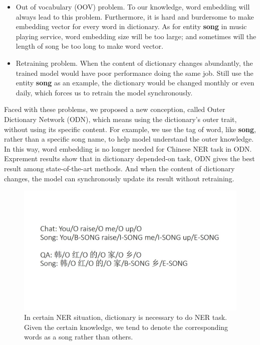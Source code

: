 \documentclass[letterpaper]{article} %
\begin{document}
\begin{itemize}
\item Out of vocabulary (OOV) problem. To our knowledge, word embedding will always lead to this problem. Furthermore, it is hard and burdersome to make embedding vector for every word in dictionary. As for entity \textbf{song} in music playing service, word embedding size will be too large; and sometimes will the length of song be too long to make word vector. 
\item Retraining problem. When the content of dictionary changes abundantly, the trained model would have poor performance doing the same job. Still use the entity \textbf{song} as an example, the dictionary would be changed monthly or even daily, which forces us to retrain the model synchronously. 
\end{itemize}

Faced with these problems, we proposed a new conception, called Outer Dictionary Network (ODN), which means using the dictionary's outer trait, without using its specific content. For example, we use the tag of word, like \textbf{song}, rather than a specific song name, to help model understand the outer knowledge. In this way, word embedding is no longer needed for Chinese NER task in ODN. Exprement results show that in dictionary depended-on task, ODN gives the best result among state-of-the-art methods. And when the content of dictionary changes, the model can synchronously update its result without retraining.

\begin{figure}[t]
\centering
\includegraphics[width=0.9\columnwidth]{gazzete_is_needed} %
\caption{In certain NER situation, dictionary is necessary to do NER task. Given the certain knowledge, we tend to denote the corresponding words as a song rather than others.}
\label{fig_gazzete}
\end{figure}
\end{document}
